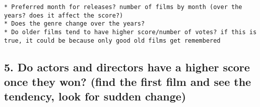 \documentclass[]{article}
\begin{document}
\begin{verbatim}
* Preferred month for releases? number of films by month (over the years? does it affect the score?)
* Does the genre change over the years?
* Do older films tend to have higher score/number of votes? if this is true, it could be because only good old films get remembered
\end{verbatim}

\hypertarget{do-actors-and-directors-have-a-higher-score-once-they-won-find-the-first-film-and-see-the-tendency-look-for-sudden-change}{%
\subsection{5. Do actors and directors have a higher score once they
won? (find the first film and see the tendency, look for sudden
change)}\label{do-actors-and-directors-have-a-higher-score-once-they-won-find-the-first-film-and-see-the-tendency-look-for-sudden-change}}
\end{document}
